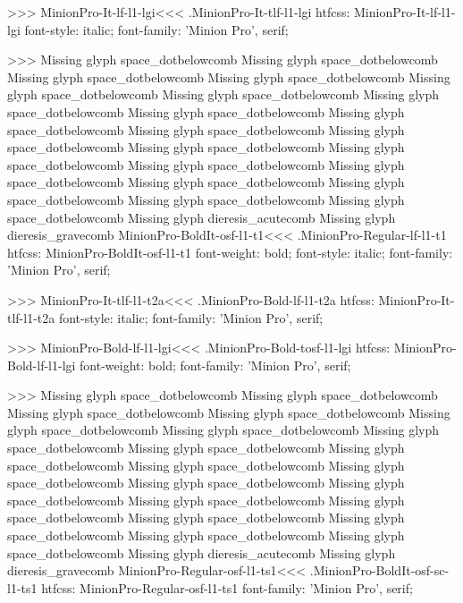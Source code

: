 {>>>
\<MinionPro-It-lf-l1-lgi\><<<
.MinionPro-It-tlf-l1-lgi
htfcss:  MinionPro-It-lf-l1-lgi  font-style: italic; font-family: 'Minion Pro', serif;

>>>
Missing glyph	space_dotbelowcomb
Missing glyph	space_dotbelowcomb
Missing glyph	space_dotbelowcomb
Missing glyph	space_dotbelowcomb
Missing glyph	space_dotbelowcomb
Missing glyph	space_dotbelowcomb
Missing glyph	space_dotbelowcomb
Missing glyph	space_dotbelowcomb
Missing glyph	space_dotbelowcomb
Missing glyph	space_dotbelowcomb
Missing glyph	space_dotbelowcomb
Missing glyph	space_dotbelowcomb
Missing glyph	space_dotbelowcomb
Missing glyph	space_dotbelowcomb
Missing glyph	space_dotbelowcomb
Missing glyph	space_dotbelowcomb
Missing glyph	space_dotbelowcomb
Missing glyph	space_dotbelowcomb
Missing glyph	space_dotbelowcomb
Missing glyph	dieresis_acutecomb
Missing glyph	dieresis_gravecomb
\<MinionPro-BoldIt-osf-l1-t1\><<<
.MinionPro-Regular-lf-l1-t1
htfcss:  MinionPro-BoldIt-osf-l1-t1  font-weight: bold; font-style: italic; font-family: 'Minion Pro', serif;

>>>
\<MinionPro-It-tlf-l1-t2a\><<<
.MinionPro-Bold-lf-l1-t2a
htfcss:  MinionPro-It-tlf-l1-t2a  font-style: italic; font-family: 'Minion Pro', serif;

>>>
\<MinionPro-Bold-lf-l1-lgi\><<<
.MinionPro-Bold-tosf-l1-lgi
htfcss:  MinionPro-Bold-lf-l1-lgi  font-weight: bold; font-family: 'Minion Pro', serif;

>>>
Missing glyph	space_dotbelowcomb
Missing glyph	space_dotbelowcomb
Missing glyph	space_dotbelowcomb
Missing glyph	space_dotbelowcomb
Missing glyph	space_dotbelowcomb
Missing glyph	space_dotbelowcomb
Missing glyph	space_dotbelowcomb
Missing glyph	space_dotbelowcomb
Missing glyph	space_dotbelowcomb
Missing glyph	space_dotbelowcomb
Missing glyph	space_dotbelowcomb
Missing glyph	space_dotbelowcomb
Missing glyph	space_dotbelowcomb
Missing glyph	space_dotbelowcomb
Missing glyph	space_dotbelowcomb
Missing glyph	space_dotbelowcomb
Missing glyph	space_dotbelowcomb
Missing glyph	space_dotbelowcomb
Missing glyph	space_dotbelowcomb
Missing glyph	dieresis_acutecomb
Missing glyph	dieresis_gravecomb
\<MinionPro-Regular-osf-l1-ts1\><<<
.MinionPro-BoldIt-osf-sc-l1-ts1
htfcss:  MinionPro-Regular-osf-l1-ts1  font-family: 'Minion Pro', serif;

}

